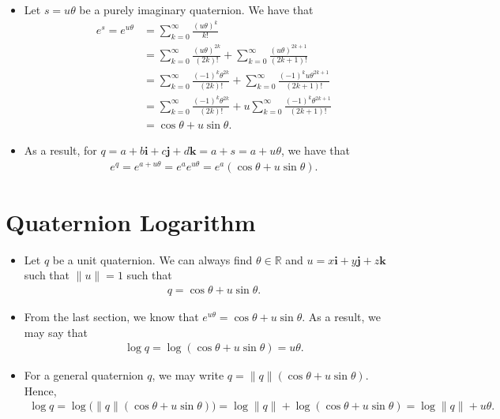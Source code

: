 \documentclass[10pt]{article}
\newcommand{\ve}[1]{\mathbf{#1}}
\newcommand{\Real}{\mathbb{R}}
\begin{document}
\begin{itemize}
    \item Let $s = u\theta$ be a purely imaginary quaternion. We have that
    \begin{align*}
        e^s = e^{u\theta}
        &= \sum_{k=0}^\infty \frac{(u\theta)^k}{k!} \\
        &= \sum_{k=0}^\infty \frac{(u\theta)^{2k}}{(2k)!} + \sum_{k=0}^\infty \frac{(u\theta)^{2k+1}}{(2k+1)!} \\
        &= \sum_{k=0}^\infty \frac{(-1)^k \theta^{2k}}{(2k)!} + \sum_{k=0}^\infty \frac{(-1)^k u \theta^{2k+1}}{(2k+1)!} \\        
        &= \sum_{k=0}^\infty \frac{(-1)^k \theta^{2k}}{(2k)!} + u \sum_{k=0}^\infty \frac{(-1)^k \theta^{2k+1}}{(2k+1)!} \\
        &= \cos \theta + u \sin \theta.
    \end{align*}

    \item As a result, for $q = a + b\ve{i} + c\ve{j} + d\ve{k} = a + s = a + u\theta$, we have that
    \begin{align*}
        e^q = e^{a+u\theta} = e^a e^{u\theta} = e^a \left( \cos \theta + u \sin \theta \right).
    \end{align*}
\end{itemize}

\section{Quaternion Logarithm}

\begin{itemize}
    \item Let $q$ be a unit quaternion. We can always find $\theta \in \Real$ and $u = x\ve{i} + y\ve{j} + z\ve{k}$ such that $\| u \| = 1$ such that
    \begin{align*}
        q = \cos\theta + u \sin\theta.
    \end{align*}

    \item From the last section, we know that $e^{u\theta} = \cos\theta + u \sin\theta$. As a result, we may say that
    \begin{align*}
        \log q = \log (\cos \theta + u \sin \theta) = u\theta.
    \end{align*}

    \item For a general quaternion $q$, we may write $q = \|q\| (\cos \theta + u \sin \theta)$. Hence,
    \begin{align*}
        \log q = \log \big( \|q\| (\cos \theta + u \sin \theta) \big) = \log \|q\| + \log (\cos \theta + u \sin \theta) = \log \|q\| + u\theta.
    \end{align*}
\end{itemize}
\end{document}
